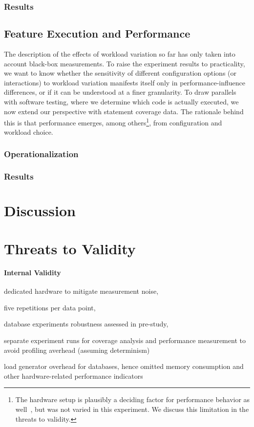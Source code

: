 \subsubsection{Results}

\subsection{Feature Execution and Performance}
The description of the effects of workload variation so far has only taken into account black-box measurements. To raise the experiment results to practicality, we want to know whether the sensitivity of different configuration options (or interactions) to workload variation manifests itself only in performance-influence differences, or if it can be understood at a finer granularity. To draw parallels with software testing, where we determine which code is actually executed, we now extend our perspective with statement coverage data. The rationale behind this is that performance emerges, among others\footnote{The hardware setup is plausibly a deciding factor for performance behavior as well~\cite{jamishidi_transfer_2017}, but was not varied in this experiment. We discuss this limitation in the threats to validity.}, from configuration and workload choice.

\subsubsection{Operationalization}
\subsubsection{Results}

\section{Discussion}

\section{Threats to Validity}\label{sec:threats}
\paragraph{Internal Validity}\label{sec:internal_validity}

\begin{compactitem}
	\item dedicated hardware to mitigate measurement noise, 
	\item five repetitions per data point, 
	\item database experiments robustness assessed in pre-study,
	\item separate experiment runs for coverage analysis and performance measurement to avoid profiling averhead (assuming determinism)
	\item load generator overhead for databases, hence omitted memory consumption and other hardware-related performance indicators 
\end{compactitem}

